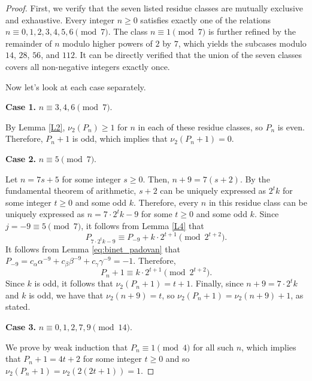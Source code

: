 \documentclass[10pt,a4paper]{amsart}
\begin{document}
\begin{proof}
	First, we verify that the seven listed residue classes are 
	mutually exclusive and exhaustive. Every integer $n\ge 0$ 
	satisfies exactly one of the relations $n\equiv 0,1,2,3,4,5,6\pmod{7}$. 
	The class $n\equiv 1\pmod{7}$ is further refined by the 
	remainder of $n$ modulo higher powers of $2$ by $7$, 
	which yields the subcases modulo $14$, $28$, $56$, and $112$. 
	It can be directly verified that the union of the seven classes 
	covers all non-negative integers exactly once.
	
	Now let's look at each case separately.
	
	\medskip
	\noindent\textbf{Case 1.} $n\equiv 3,4,6\pmod{7}$.
	
	By Lemma \ref{L2}, $\nu_2(P_n)\ge 1$ for $n$ in each of 
	these residue classes, so $P_n$ is even. Therefore, $P_n+1$ 
	is odd, which implies that $\nu_2(P_n+1)=0$.
	
		\medskip
	\noindent\textbf{Case 2.} $n\equiv 5\pmod{7}$.
	
	Let $n=7s+5$ for some integer $s\ge 0$. Then, $n+9=7(s+2)$. By the fundamental theorem of arithmetic, $s+2$ can be uniquely expressed as $2^{t}k$ for some integer $t\ge 0$ and some odd $k$. Therefore, every $n$ in this residue 
	class can be uniquely expressed as $n=7\cdot 2^t k-9$ for 
	some $t\ge 0$ and some odd $k$. Since 
	$j=-9\equiv 5\pmod{7}$, it follows from Lemma \ref{L4} that
	\begin{equation*}
		P_{7\cdot 2^t k-9}\equiv P_{-9}+k\cdot 2^{t+1}
		\pmod{2^{t+2}}.
	\end{equation*}
	It follows from Lemma \ref{eq:binet_padovan} that $P_{-9}=c_{\alpha}\alpha^{-9}+c_{\beta}\beta^{-9}+c_{\gamma}\gamma^{-9}=-1$. Therefore,
	\begin{equation*}
		P_n+1\equiv k\cdot 2^{t+1}\pmod{2^{t+2}}.
	\end{equation*}
	Since $k$ is odd, it follows that $\nu_2(P_n+1)=t+1$. 
	Finally, since $n+9=7\cdot 2^t k$ and $k$ is odd, we 
	have that $\nu_2(n+9)=t$, so $\nu_2(P_n+1)=\nu_2(n+9)+1$, as stated.
	
	\medskip
	\noindent\textbf{Case 3.} $n\equiv 0,1,2,7,9\pmod{14}$.
	
	We prove by weak induction that $P_n\equiv 1\pmod{4}$ for all such $n$, which implies that $P_{n}+1=4t+2$ for some integer $t\ge 0$ and so $\nu_2(P_n+1)=\nu_{2}(2(2t+1))=1$.
	

\end{proof}
\end{document}
